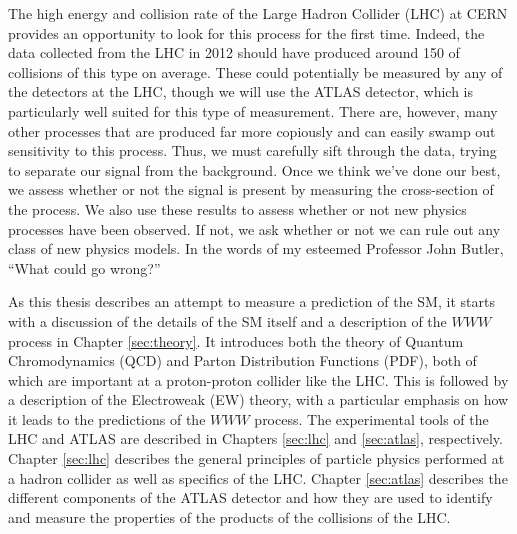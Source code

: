 The high energy and collision rate of the Large Hadron Collider (LHC) at CERN
provides an opportunity to look for this process for the first time. 
Indeed, the data collected from the LHC in 2012 should have produced around 150 of collisions
of this type on average. These could potentially be measured by any of the detectors
at the LHC, though we will use the ATLAS detector, which is particularly well suited 
for this type of measurement. There are, however, many other processes that are produced
far more copiously and can easily swamp out sensitivity to this process. 
Thus, we must carefully sift through the data, trying to separate our signal
from the background.  Once we think we've done our best, we assess 
whether or not the signal is present by measuring the cross-section of the process. 
We also use these results to assess whether or not new physics processes have been 
observed. If not, we ask whether or not 
we can rule out any class of new physics models. 
In the words of my esteemed Professor John Butler, ``What could go wrong?''


As this thesis describes an attempt to measure a prediction of the SM, it starts
with a discussion of the details of the SM itself and a description of the 
$WWW$ process in Chapter \ref{sec:theory}. It introduces both the theory 
of Quantum Chromodynamics (QCD) and Parton Distribution Functions (PDF), both
of which are important at a proton-proton collider like the LHC.  
This is followed by 
a description of the Electroweak (EW) theory, with a particular emphasis
on how it leads to the predictions of the $WWW$ process. The experimental
tools of the LHC and ATLAS are described in Chapters \ref{sec:lhc} and
\ref{sec:atlas}, respectively. Chapter \ref{sec:lhc}
describes the general principles of particle physics performed at a hadron collider
as well as specifics of the LHC. 
Chapter \ref{sec:atlas} describes the different components of the ATLAS detector
and how they are used to identify and measure the properties of the products
of the collisions of the LHC.  

